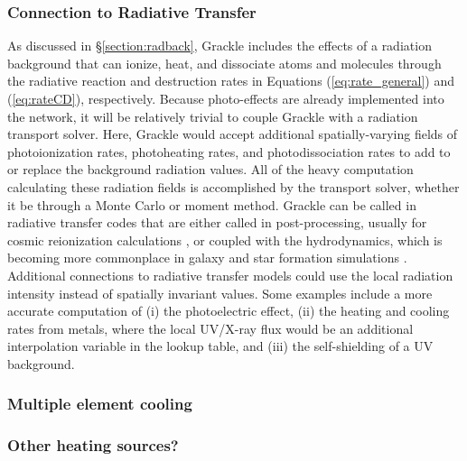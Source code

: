 \subsubsection{Connection to Radiative Transfer}

As discussed in \S\ref{section:radback}, Grackle includes the effects
of a radiation background that can ionize, heat, and dissociate atoms
and molecules through the radiative reaction and destruction rates in
Equations (\ref{eq:rate_general}) and (\ref{eq:rateCD}), respectively.
Because photo-effects are already implemented into the network, it will
be relatively trivial to couple Grackle with a radiation transport
solver.  Here, Grackle would accept additional spatially-varying
fields of photoionization rates, photoheating rates, and
photodissociation rates to add to or replace the background radiation
values.  All of the heavy computation calculating these radiation
fields is accomplished by the transport solver, whether it be through
a Monte Carlo or moment method.  Grackle can be called in radiative
transfer codes that are either called in post-processing, usually for
cosmic reionization calculations \citep[e.g.][]{2014MNRAS.439..725I,
  2016MNRAS.459.2342M}, or coupled with the hydrodynamics, which is
becoming more commonplace in galaxy and star formation simulations
\citep[e.g.][]{2014MNRAS.442.2560W, 2015MNRAS.451...34R,
  2015arXiv151100011O, 2016arXiv160300034P, 2016arXiv160703117R}.
Additional connections to radiative transfer models could use the
local radiation intensity instead of spatially invariant values.  Some
examples include a more accurate computation of (i) the photoelectric
effect, (ii) the heating and cooling rates from metals, where the
local UV/X-ray flux would be an additional interpolation variable in
the lookup table, and (iii) the self-shielding of a UV background.

\subsubsection{Multiple element cooling}

\subsubsection{Other heating sources?}

